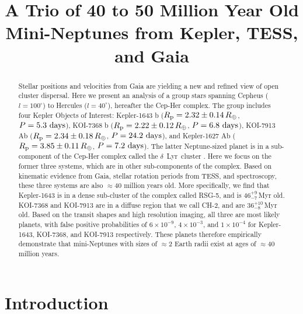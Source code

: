 \documentclass[12pt,twocolumn,linenumbers]{aastex63}
\begin{document}
\title{
  A Trio of 40 to 50 Million Year Old Mini-Neptunes from Kepler, TESS, and Gaia
}



\begin{abstract}
  Stellar positions and velocities from Gaia are yielding a new and
  refined view of open cluster dispersal.
  Here we present an analysis of a group stars spanning Cepheus
  ($l=100^\circ$) to Hercules ($l=40^\circ$), hereafter the Cep-Her
  complex.
  The group includes four Kepler Objects of Interest:
  Kepler-1643 b ($R_{\rm p} = 2.32 \pm 0.14\,R_\oplus$, $P = 5.3\ {\rm days}$),
  KOI-7368 b ($R_{\rm p} = 2.22 \pm 0.12\,R_\oplus$, $P = 6.8\ {\rm days}$), 
  KOI-7913 Ab ($R_{\rm p} = 2.34 \pm 0.18\,R_\oplus$, $P = 24.2\ {\rm days}$), and
  Kepler-1627 Ab ($R_{\rm p} = 3.85 \pm 0.11\,R_\oplus$, $P = 7.2\ {\rm days}$).
  The latter Neptune-sized planet is in a sub-component of the
  Cep-Her complex called the $\delta$\ Lyr\ cluster
  \citep{bouma_kep1627_2022}.
  Here we focus on the former three systems, which are in other
  sub-components of the complex.
  Based on kinematic evidence from Gaia, stellar rotation periods from
  TESS, and spectroscopy, these three systems are also $\approx$40
  million years old.
  More specifically, we find that Kepler-1643 is in a dense
  sub-cluster of the complex called RSG-5, and is $46^{+9}_{-7}$\,Myr old.
  KOI-7368 and KOI-7913 are in a diffuse region that we call
  CH-2, and are $36^{+10}_{-8}$\,Myr old.
  Based on the transit shapes and high resolution imaging, all three are
  most likely planets, with false positive probabilities of
  $6\times10^{-9}$, $4\times10^{-3}$, and $1\times10^{-4}$ for
  Kepler-1643, KOI-7368, and KOI-7913 respectively.
  These planets therefore empirically
  demonstrate that mini-Neptunes with sizes of $\approx$2 Earth
  radii exist at ages of $\approx$40 million years.
\end{abstract}





\section{Introduction}
\end{document}
